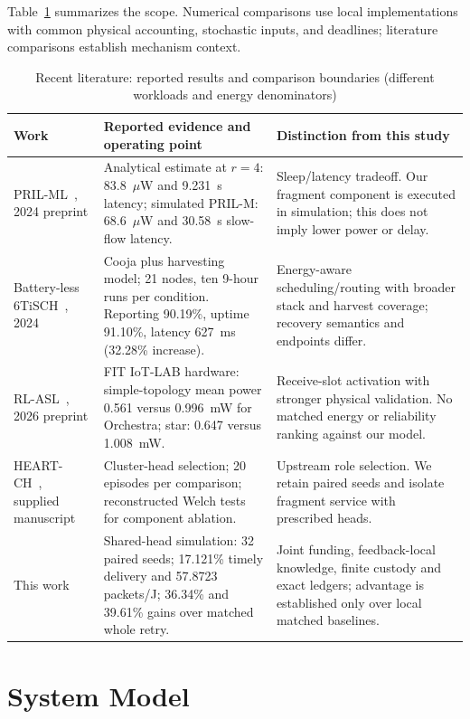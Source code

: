 \documentclass[journal,10pt]{IEEEtran}
\begin{document}
Table~\ref{tab:related} summarizes the scope. Numerical comparisons use local implementations with common physical accounting, stochastic inputs, and deadlines; literature comparisons establish mechanism context.

\begin{table}[t]
\caption{Recent literature: reported results and comparison boundaries (different workloads and energy denominators)}
\label{tab:related}\centering\small
\begin{tabular}{p{}p{}p{}}
\toprule Work & Reported evidence and operating point & Distinction from this study \\
\midrule
PRIL-ML~\cite{scanzio}, 2024 preprint & Analytical estimate at $r=4$: 83.8~$\mu$W and 9.231~s latency; simulated PRIL-M: 68.6~$\mu$W and 30.58~s slow-flow latency. & Sleep/latency tradeoff. Our fragment component is executed in simulation; this does not imply lower power or delay.\\
Battery-less 6TiSCH~\cite{vanleemput}, 2024 & Cooja plus harvesting model; 21 nodes, ten 9-hour runs per condition. Reporting 90.19\%, uptime 91.10\%, latency 627~ms (32.28\% increase). & Energy-aware scheduling/routing with broader stack and harvest coverage; recovery semantics and endpoints differ.\\
RL-ASL~\cite{rlasl}, 2026 preprint & FIT IoT-LAB hardware: simple-topology mean power 0.561 versus 0.996~mW for Orchestra; star: 0.647 versus 1.008~mW. & Receive-slot activation with stronger physical validation. No matched energy or reliability ranking against our model.\\
HEART-CH~\cite{heart}, supplied manuscript & Cluster-head selection; 20 episodes per comparison; reconstructed Welch tests for component ablation. & Upstream role selection. We retain paired seeds and isolate fragment service with prescribed heads.\\
This work & Shared-head simulation: 32 paired seeds; 17.121\% timely delivery and 57.8723 packets/J; 36.34\% and 39.61\% gains over matched whole retry. & Joint funding, feedback-local knowledge, finite custody and exact ledgers; advantage is established only over local matched baselines.\\
\bottomrule
\end{tabular}
\end{table}

\section{System Model}
\end{document}
